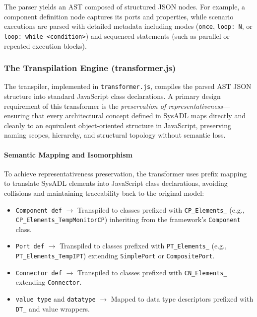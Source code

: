 The parser yields an AST composed of structured JSON nodes. For example, a component definition node captures its ports and properties, while scenario executions are parsed with detailed metadata including modes (\texttt{once}, \texttt{loop: N}, or \texttt{loop: while <condition>}) and sequenced statements (such as parallel or repeated execution blocks).

\subsubsection{The Transpilation Engine (transformer.js)}
The transpiler, implemented in \texttt{transformer.js}, compiles the parsed AST JSON structure into standard JavaScript class declarations. A primary design requirement of this transformer is the \emph{preservation of representativeness}—ensuring that every architectural concept defined in SysADL maps directly and cleanly to an equivalent object-oriented structure in JavaScript, preserving naming scopes, hierarchy, and structural topology without semantic loss.

\paragraph{Semantic Mapping and Isomorphism}
To achieve representativeness preservation, the transformer uses prefix mapping to translate SysADL elements into JavaScript class declarations, avoiding collisions and maintaining traceability back to the original model:
\begin{itemize}
    \item \texttt{Component def} $\rightarrow$ Transpiled to classes prefixed with \texttt{CP\_Elements\_} (e.g., \texttt{CP\_Elements\_TempMonitorCP}) inheriting from the framework's \texttt{Component} class.
    \item \texttt{Port def} $\rightarrow$ Transpiled to classes prefixed with \texttt{PT\_Elements\_} (e.g., \texttt{PT\_Elements\_TempIPT}) extending \texttt{SimplePort} or \texttt{CompositePort}.
    \item \texttt{Connector def} $\rightarrow$ Transpiled to classes prefixed with \texttt{CN\_Elements\_} extending \texttt{Connector}.
    \item \texttt{value type} and \texttt{datatype} $\rightarrow$ Mapped to data type descriptors prefixed with \texttt{DT\_} and value wrappers.
\end{itemize}

